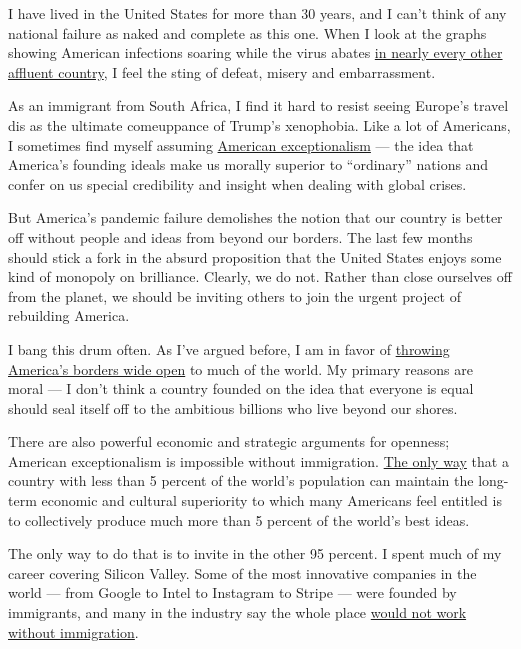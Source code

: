 I have lived in the United States for more than 30 years, and I can't
think of any national failure as naked and complete as this one. When I
look at the graphs showing American infections soaring while the virus
abates
\href{https://www.nytimes3xbfgragh.onion/2020/06/29/briefing/coronavirus-mississippi-new-england-patriots-your-monday-briefing.html}{in
nearly every other affluent country}, I feel the sting of defeat, misery
and embarrassment.

As an immigrant from South Africa, I find it hard to resist seeing
Europe's travel dis as the ultimate comeuppance of Trump's xenophobia.
Like a lot of Americans, I sometimes find myself assuming
\href{https://theweek.com/articles/654508/what-exactly-american-exceptionalism}{American
exceptionalism} --- the idea that America's founding ideals make us
morally superior to ``ordinary'' nations and confer on us special
credibility and insight when dealing with global crises.

But America's pandemic failure demolishes the notion that our country is
better off without people and ideas from beyond our borders. The last
few months should stick a fork in the absurd proposition that the United
States enjoys some kind of monopoly on brilliance. Clearly, we do not.
Rather than close ourselves off from the planet, we should be inviting
others to join the urgent project of rebuilding America.

I bang this drum often. As I've argued before, I am in favor of
\href{https://www.nytimes3xbfgragh.onion/2019/01/16/opinion/open-borders-immigration.html}{throwing
America's borders wide open} to much of the world. My primary reasons
are moral --- I don't think a country founded on the idea that everyone
is equal should seal itself off to the ambitious billions who live
beyond our shores.

There are also powerful economic and strategic arguments for openness;
American exceptionalism is impossible without immigration.
\href{http://paulgraham.com/95.html}{The only way} that a country with
less than 5 percent of the world's population can maintain the long-term
economic and cultural superiority to which many Americans feel entitled
is to collectively produce much more than 5 percent of the world's best
ideas.

The only way to do that is to invite in the other 95 percent. I spent
much of my career covering Silicon Valley. Some of the most innovative
companies in the world --- from Google to Intel to Instagram to Stripe
--- were founded by immigrants, and many in the industry say the whole
place
\href{https://www.nytimes3xbfgragh.onion/2017/02/08/technology/personaltech/why-silicon-valley-wouldnt-work-without-immigrants.html}{would
not work without immigration}.

